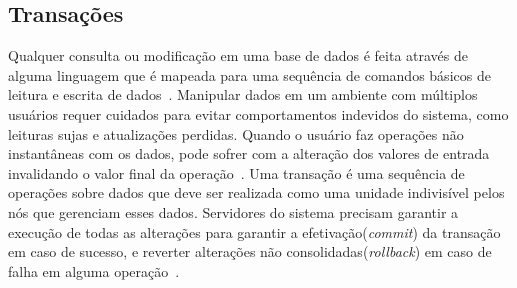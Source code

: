 \subsection{Transações}\label{subsec:transacoes}

Qualquer consulta ou modificação em uma base de dados é feita através de alguma linguagem que é mapeada para uma sequência de comandos básicos de leitura e escrita de dados~\cite{santos1992efetivacao}. Manipular dados em um ambiente com múltiplos usuários requer cuidados para evitar comportamentos indevidos do sistema, como leituras sujas e atualizações perdidas. Quando o usuário faz operações não instantâneas com os dados, pode sofrer com a alteração dos valores de entrada invalidando o valor final da operação~\cite{harder1983principles}. Uma transação é uma sequência de operações sobre dados que deve ser realizada como uma unidade indivisível pelos nós que gerenciam esses dados. Servidores do sistema precisam garantir a execução de todas as alterações para garantir a efetivação(\textit{commit}) da transação em caso de sucesso, e reverter alterações não consolidadas(\textit{rollback}) em caso de falha em alguma operação~\cite{Coulouris2013}.

